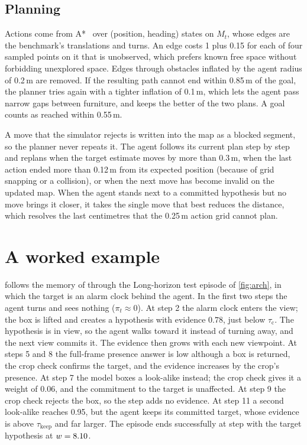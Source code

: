 \subsection{Planning}
\label{sec:method-planning}
Actions come from A*~\cite{hart1968astar} over (position, heading) states on $M_t$, whose edges are the benchmark's
translations and turns. An edge costs 1 plus 0.15 for each of four sampled points on it that is unobserved, which
prefers known free space without forbidding unexplored space. Edges through obstacles inflated by the agent radius of
0.2\,m are removed. If the resulting path cannot end within 0.85\,m of the goal, the planner tries again with a
tighter inflation of 0.1\,m, which lets the agent pass narrow gaps between furniture, and keeps the better of the two
plans. A goal counts as reached within 0.55\,m.

A move that the simulator rejects is written into the map as a blocked segment, so the planner never repeats it. The
agent follows its current plan step by step and replans when the target estimate moves by more than 0.3\,m, when the
last action ended more than 0.12\,m from its expected position (because of grid snapping or a collision), or when
the next move has become invalid on the updated map. When the agent stands next to a committed hypothesis but no
move brings it closer, it takes the single move that best reduces the distance, which resolves the last centimetres
that the 0.25\,m action grid cannot plan.

\section{A worked example}
\label{sec:method-example}
 follows the memory of \ours through the Long-horizon test episode of \cref{fig:arch}, in which
the target is an alarm clock behind the agent. In the first two steps the agent turns and sees nothing ($\pi_t\approx0$).
At step 2 the alarm clock enters the view; the box is lifted and creates a hypothesis with evidence $0.78$, just
below $\tau_\mathrm{c}$. The hypothesis is in view, so the agent walks toward it instead of turning away, and the next view
commits it. The evidence then grows with each new viewpoint. At steps 5 and 8 the full-frame presence answer is low
although a box is returned, the crop check confirms the target, and the evidence increases by the crop's presence. At
step 7 the model boxes a look-alike instead; the crop check gives it a weight of 0.06, and the commitment to the
target is unaffected. At step 9 the crop check rejects the box, so the step adds no evidence. At step 11 a second
look-alike reaches 0.95, but the agent keeps its committed target, whose evidence is above $\tau_\mathrm{keep}$ and far larger.
The episode ends successfully at step \tTraceSteps{} with the target hypothesis at $w=8.10$.

